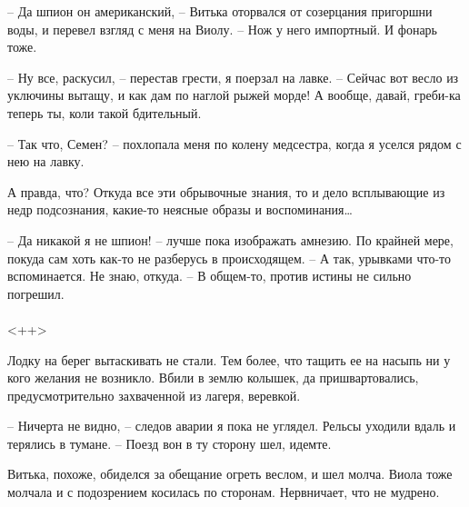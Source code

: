 \documentclass[a4paper]{book}
\begin{document}
-- Да шпион он американский, -- Витька оторвался от созерцания пригоршни воды, и перевел взгляд с меня на Виолу. -- Нож у него импортный. И фонарь тоже. 

-- Ну все, раскусил, -- перестав грести, я поерзал на лавке. -- Сейчас вот весло из уключины вытащу, и как дам по наглой рыжей морде! А вообще, давай, греби-ка теперь ты, коли такой бдительный.

-- Так  что, Семен? -- похлопала меня по колену медсестра, когда я уселся рядом с нею на лавку. 

А правда, что? Откуда все эти обрывочные знания, то и дело всплывающие из недр подсознания, какие-то неясные образы и воспоминания\ldots

-- Да никакой я не шпион! -- лучше пока изображать амнезию. По крайней мере, покуда сам хоть как-то не разберусь в происходящем. -- А так, урывками что-то вспоминается. Не знаю, откуда. -- В общем-то, против истины не сильно погрешил.

\paragraph{}<++>

Лодку на берег вытаскивать не стали. Тем более, что тащить ее на насыпь ни у кого желания не возникло. Вбили в землю колышек, да пришвартовались, предусмотрительно захваченной из лагеря, веревкой.

-- Ничерта не видно, -- следов аварии я пока не углядел. Рельсы уходили вдаль и терялись в тумане. -- Поезд вон в ту сторону шел, идемте.

Витька, похоже, обиделся за обещание огреть веслом, и шел молча. Виола тоже молчала и с подозрением косилась по сторонам. Нервничает, что не мудрено.  
\end{document}

